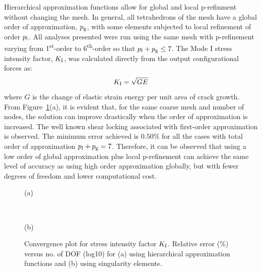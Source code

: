 \documentclass[twocolumn]{svjour3}
\begin{document}
Hierarchical approximation functions allow for global and local p-refinment without changing the mesh.
In general, all tetrahedrons of the mesh have a global order of approximation, $p_{\rm g}$, with some elements subjected to local refinement of order $p_{\rm{l}}$.
All analyses presented were run using the same mesh with p-refinement varying from 1\textsuperscript{st}-order to 6\textsuperscript{th}-order so that $p_{\rm l} + p_{\rm g} \leq 7$.
The Mode I stress intensity factor, $K_{\rm I}$, was calculated directly from the output configurational forces as: 
\begin{equation}
K_{\rm I} = \sqrt{GE}
\end{equation}
where $G$ is the change of elastic strain energy per unit area of crack growth.
From Figure~\ref{fig:plate_conv}(a), it is evident that, for the same coarse mesh and number of nodes, the solution can improve drastically when the order of approximation is increased. 
The well known shear locking associated with first-order approximation is observed. 
The minimum error achieved is $0.50\%$ for all the cases with total order of approximation  $p_{\rm l} + p_{\rm g} = 7$. 
Therefore, it can be observed that using a low order of global approximation plus local p-refinement 
can achieve the same level of accuracy as using high order approximation globally, but with fewer degrees of freedom and lower computational cost.
\begin{figure}[h]
	\centering

	
	\begin{minipage}{.45\textwidth}
		\begin{centering} (a) \end{centering}
	\end{minipage}%
	\\
	\begin{minipage}{.45\textwidth}
\begin{centering} (b) \end{centering}
	\end{minipage}
	\caption{Convergence plot for stress intensity factor $K_{\rm I}$. Relative error (\%) versus no. of DOF (log10) for (a) using hierarchical approximation functions and (b) using singularity elements.}
			\label{fig:plate_conv}
\end{figure}
\end{document}
